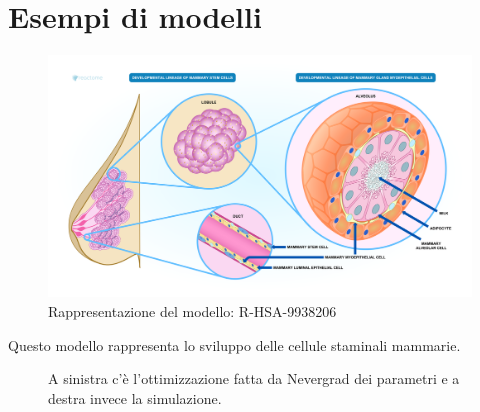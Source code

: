 \chapter{Esempi di modelli}


\begin{figure}[htbp]
    \centering
    \includegraphics[width=\textwidth]{R-HSA-9938206.png}
    \caption{Rappresentazione del modello: R-HSA-9938206}
    \label{fig:R-HSA-9938206}
\end{figure}

Questo modello rappresenta lo sviluppo delle cellule staminali mammarie.

\begin{figure}[htbp]
    \centering
    \caption{A sinistra c'è l'ottimizzazione fatta da Nevergrad dei parametri e a destra invece la simulazione.}
    \label{fig:due-immagini-affiancate}
\end{figure}


